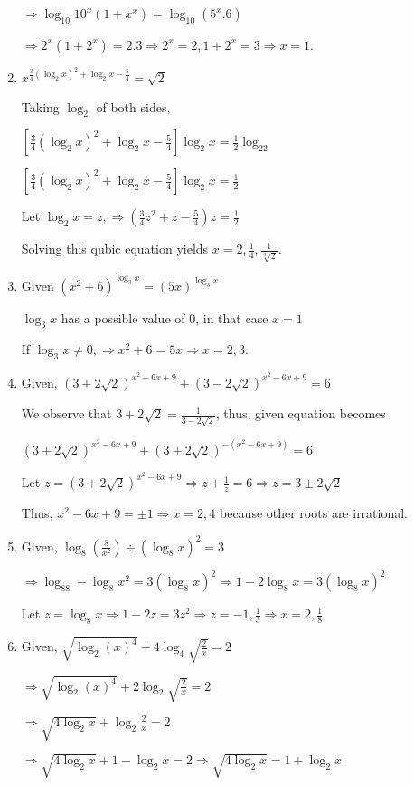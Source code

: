 \begin{enumerate}
  $\Rightarrow \log_{10}10^x(1 + x^x) = \log_{10}(5^x.6)$

  $\Rightarrow 2^x(1 + 2^x) = 2.3 \Rightarrow 2^x = 2, 1 + 2^x = 3 \Rightarrow x = 1$.
\item $x^{\tfrac{3}{4}(\log_2x)^2 + \log_2x - \tfrac{5}{4}} = \sqrt{2}$

  Taking $\log_2$ of both sides,

  $\left[\frac{3}{4}(\log_2x)^2 + \log_2x - \frac{5}{4}\right]\log_2x = \frac{1}{2}\log_22$

  $\left[\frac{3}{4}(\log_2x)^2 + \log_2x - \frac{5}{4}\right]\log_2x = \frac{1}{2}$

  Let $\log_2x = z, \Rightarrow \left(\frac{3}{4}z^2 + z - \frac{5}{4}\right)z = \frac{1}{2}$

  Solving this qubic equation yields $x = 2, \frac{1}{4}, \frac{1}{\sqrt[3]{2}}$.
\item Given $(x^2 + 6)^{\log_3x} = (5x)^{\log_3x}$

  $\log_3x$ has a possible value of $0$, in that case $x = 1$

  If $\log_3x\neq 0, \Rightarrow x^2 + 6 = 5x \Rightarrow x = 2, 3$.
\item Given, $(3 + 2\sqrt{2})^{x^2 - 6x + 9} + (3 - 2\sqrt{2})^{x^2 - 6x + 9} = 6$

  We observe that $3 + 2\sqrt{2} = \frac{1}{3 - 2\sqrt{2}}$, thus, given equation becomes

  $(3 + 2\sqrt{2})^{x^2 - 6x + 9} + (3 + 2\sqrt{2})^{-(x^2 - 6x + 9)} = 6$

  Let $z = (3 + 2\sqrt{2})^{x^2 - 6x + 9}\Rightarrow z + \frac{1}{z} = 6 \Rightarrow z = 3\pm2\sqrt{2}$

  Thus, $x^2 - 6x + 9 = \pm 1 \Rightarrow x = 2, 4$ because other roots are irrational.
\item Given, $\log_8\left(\frac{8}{x^2}\right)\div(\log_8x)^2 = 3$

  $\Rightarrow \log_88 - \log_8x^2 = 3(\log_8x)^2 \Rightarrow 1 - 2\log_8x = 3(\log_8x)^2$

  Let $z = \log_8x\Rightarrow 1 - 2z = 3z^2 \Rightarrow z = -1, \frac{1}{3}\Rightarrow x = 2, \frac{1}{8}$.
\item Given, $\sqrt{\log_2(x)^4} + 4\log_4\sqrt{\tfrac{2}{x}} = 2$

  $\Rightarrow \sqrt{\log_2(x)^4} + 2\log_2\sqrt{\tfrac{2}{x}} = 2$

  $\Rightarrow \sqrt{4\log_2x} + \log_2\tfrac{2}{x} = 2$

  $\Rightarrow \sqrt{4\log_2x} + 1 - \log_2x = 2 \Rightarrow \sqrt{4\log_2x} = 1 + \log_2x$


\end{enumerate}
